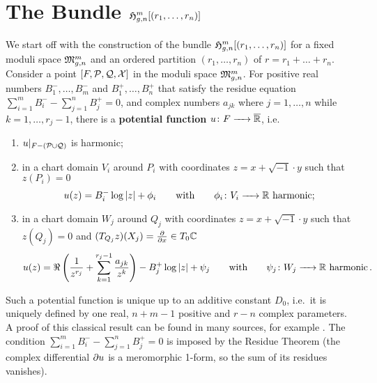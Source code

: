 \section{The Bundle \texorpdfstring{$\Harmr$}{Hmgn[r]}}
\label{cellular_models:from_moduli_spaces_to_parallel_slit_domains}
\label{page:potential_function_parallel}%

We start off with the construction of the bundle $\Harmr$ for a fixed moduli space $\Modspc$ and an ordered partition $(r_1, \ldots, r_n)$ of $r = r_1 + \ldots + r_n$.
Consider a point $[F, \mc P, \mc Q, \mc X]$ in the moduli space $\Modspc$.
For positive real numbers $B_1^-, \ldots, B_m^-$ and $B_1^+, \ldots, B_n^+$ that satisfy the residue equation $\sum_{i=1}^{m} B_i^- - \sum_{j=1}^n B_j^+ = 0$,
and complex numbers $a_{jk}$ where $j = 1, \ldots, n$ while $k = 1, \ldots, r_j-1$, there is a {\bfseries potential function} $u \colon F \to \ov{\mathbb R}$, i.e.\ 
\begin{enumerate}
    \item $u|_{F - (\mc P \cup \mc Q)}$ is harmonic;
    \item in a chart domain $V_i$ around $P_i$ with coordinates $z = x + \sqrt{-1}\cdot y$ such that $z(P_i) = 0$
        \[
            u(z) = B_i^- \log|z| + \phi_i \mspc{with}{20} \phi_i \colon V_i \to \mathbb R \text{ harmonic};
        \]
    \item in a chart domain $W_j$ around $Q_j$ with coordinates $z = x + \sqrt{-1}\cdot y$ such that $z(Q_j) = 0$ and $(T_{Q_j}z) (X_j) = \frac{\del}{\del x} \in T_0\mathbb C$
        \[
            u(z) = \Re \left( \frac{1}{z^{r_j}} + \sum_{k=1}^{r_j-1} \frac{a_{jk}}{z^k} \right) - B_j^+ \log|z| + \psi_j \mspc{with}{20} \psi_j \colon W_j \to \mathbb R \text{ harmonic} \,.
        \]
\end{enumerate}
Such a potential function is unique up to an additive constant $D_0$, i.e.\
it is uniquely defined by one real, $n+m-1$ positive and $r-n$ complex parameters.
A proof of this classical result can be found in many sources, for example \cite{Koch199105}.
The condition $\sum_{i=1}^{m} B_i^- - \sum_{j=1}^n B_j^+ = 0$ is imposed by the Residue Theorem
(the complex differential $\del u$ is a meromorphic 1-form, so the sum of its residues vanishes).


